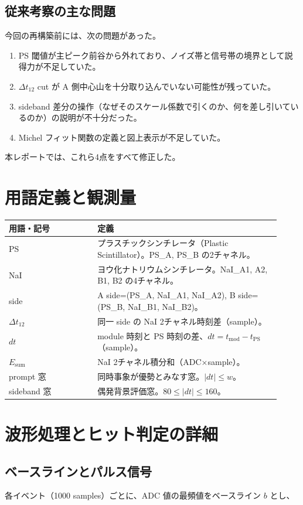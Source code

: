 \documentclass[a4paper,11pt]{jsarticle}
\begin{document}
\subsection{従来考察の主な問題}
今回の再構築前には、次の問題があった。
\begin{enumerate}
  \item PS 閾値が主ピーク前谷から外れており、ノイズ帯と信号帯の境界として説得力が不足していた。
  \item $\Delta t_{12}$ cut が A 側中心山を十分取り込んでいない可能性が残っていた。
  \item sideband 差分の操作（なぜそのスケール係数で引くのか、何を差し引いているのか）の説明が不十分だった。
  \item Michel フィット関数の定義と図上表示が不足していた。
\end{enumerate}

本レポートでは、これら4点をすべて修正した。

\section{用語定義と観測量}
\begin{longtable}{p{0.30\linewidth}p{0.62\linewidth}}
\toprule
用語・記号 & 定義 \\
\midrule
PS & プラスチックシンチレータ（Plastic Scintillator）。PS\_A, PS\_B の2チャネル。 \\
NaI & ヨウ化ナトリウムシンチレータ。NaI\_A1, A2, B1, B2 の4チャネル。 \\
side & A side=(PS\_A, NaI\_A1, NaI\_A2), B side=(PS\_B, NaI\_B1, NaI\_B2)。 \\
$\Delta t_{12}$ & 同一 side の NaI 2チャネル時刻差（sample）。 \\
$dt$ & module 時刻と PS 時刻の差、$dt=t_{\mathrm{mod}}-t_{\mathrm{PS}}$（sample）。 \\
$E_{\mathrm{sum}}$ & NaI 2チャネル積分和（ADC$\times$sample）。 \\
prompt 窓 & 同時事象が優勢とみなす窓。$|dt|\le w$。 \\
sideband 窓 & 偶発背景評価窓。$80\le |dt|\le 160$。 \\
\bottomrule
\end{longtable}

\section{波形処理とヒット判定の詳細}
\subsection{ベースラインとパルス信号}
各イベント（1000 samples）ごとに、ADC 値の最頻値をベースライン $b$ とし、
\end{document}

